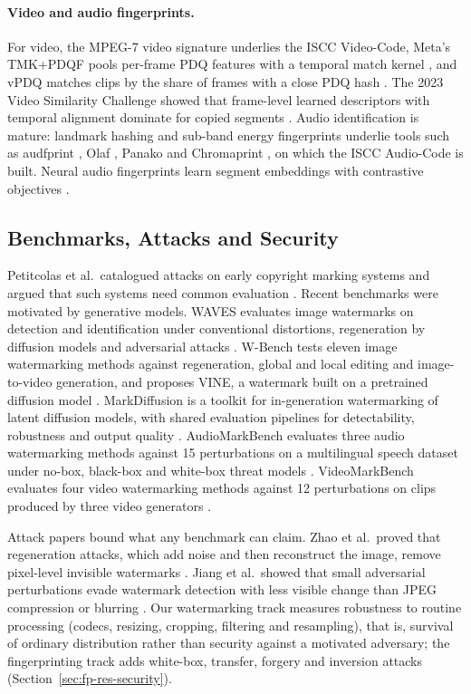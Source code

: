 \paragraph{Video and audio fingerprints.} For video, the MPEG-7 video signature \cite{paschalakis2012mpeg7} underlies the ISCC Video-Code, Meta's TMK+PDQF pools per-frame PDQ features with a temporal match kernel \cite{poullot2015tmk, meta2019pdq}, and vPDQ matches clips by the share of frames with a close PDQ hash \cite{meta_vpdq}. The 2023 Video Similarity Challenge showed that frame-level learned descriptors with temporal alignment dominate for copied segments \cite{pizzi2024vsc}. Audio identification is mature: landmark hashing \cite{wang2003shazam} and sub-band energy fingerprints \cite{haitsma2002robust} underlie tools such as audfprint \cite{ellis_audfprint}, Olaf \cite{six2023olaf}, Panako \cite{six2022panako} and Chromaprint \cite{lalinsky_chromaprint}, on which the ISCC Audio-Code is built. Neural audio fingerprints learn segment embeddings with contrastive objectives \cite{chang2021nafp, araz2025nmfp}.

\subsection{Benchmarks, Attacks and Security}
Petitcolas et al.\ catalogued attacks on early copyright marking systems and argued that such systems need common evaluation \cite{petitcolas1998attacks}. Recent benchmarks were motivated by generative models. WAVES evaluates image watermarks on detection and identification under conventional distortions, regeneration by diffusion models and adversarial attacks \cite{an2024waves}. W-Bench tests eleven image watermarking methods against regeneration, global and local editing and image-to-video generation, and proposes VINE, a watermark built on a pretrained diffusion model \cite{lu2025vine}. MarkDiffusion is a toolkit for in-generation watermarking of latent diffusion models, with shared evaluation pipelines for detectability, robustness and output quality \cite{pan2025markdiffusion}. AudioMarkBench evaluates three audio watermarking methods against 15 perturbations on a multilingual speech dataset under no-box, black-box and white-box threat models \cite{liu2024audiomarkbench}. VideoMarkBench evaluates four video watermarking methods against 12 perturbations on clips produced by three video generators \cite{jiang2025videomarkbench}.

Attack papers bound what any benchmark can claim. Zhao et al.\ proved that regeneration attacks, which add noise and then reconstruct the image, remove pixel-level invisible watermarks \cite{zhao2024removable}. Jiang et al.\ showed that small adversarial perturbations evade watermark detection with less visible change than JPEG compression or blurring \cite{jiang2023evading}. Our watermarking track measures robustness to routine processing (codecs, resizing, cropping, filtering and resampling), that is, survival of ordinary distribution rather than security against a motivated adversary; the fingerprinting track adds white-box, transfer, forgery and inversion attacks (Section~\ref{sec:fp-res-security}).

